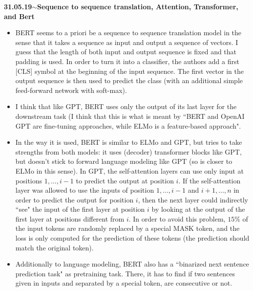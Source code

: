 \documentclass[11pt,a4paper]{article}
\newenvironment{loggentry}[2]%
{\noindent\textbf{#1}\hspace{1cm}$\mathbf{\sim}$\text{ }\textbf{#2}\\}{\vspace{0.5cm}}
\begin{document}
\begin{loggentry}{31.05.19}{Sequence to sequence translation, Attention, Transformer, and Bert}
\begin{itemize}
\item BERT seems to a priori be a sequence to sequence translation model in the sense that it takes a sequence as input and output a sequence of vectors. I guess that the length of both input and output sequence is fixed and that padding is used. In order to turn it into a classifier, the authors add a first [CLS] symbol at the beginning of the input sequence. The first vector in the output sequence is then used to predict the class (with an additional simple feed-forward network with soft-max).
\item I think that like GPT, BERT uses only the output of its last layer for the downstream task (I think that this is what is meant by ``BERT and OpenAI GPT are fine-tuning approaches, while ELMo is a feature-based approach".
\item In the way it is used, BERT is similar to ELMo and GPT, but tries to take strengths from both models: it uses (decoder) transformer blocks like GPT, but doesn't stick to forward language modeling like GPT (so is closer to ELMo in this sense). In GPT, the self-attention layers can use only input at positions $1, \dots, i-1$ to predict the output at position $i$. If the self-attention layer was allowed to use the inputs of position $1, \dots, i-1$ and $i+1, \dots, n$ in order to predict the output for position $i$, then the next layer could indirectly ``see" the input of the first layer at position $i$ by looking at the output of the first layer at positions different from $i$. In order to avoid this problem, $15\%$ of the input tokens are randomly replaced by a special MASK token, and the loss is only computed for the prediction of these tokens (the prediction should match the original token).
\item Additionally to language modeling, BERT also has a ``binarized next sentence prediction task" as pretraining task. There, it has to find if two sentences given in inputs and separated by a special token, are consecutive or not.
\end{itemize}

\end{loggentry}
\end{document}
